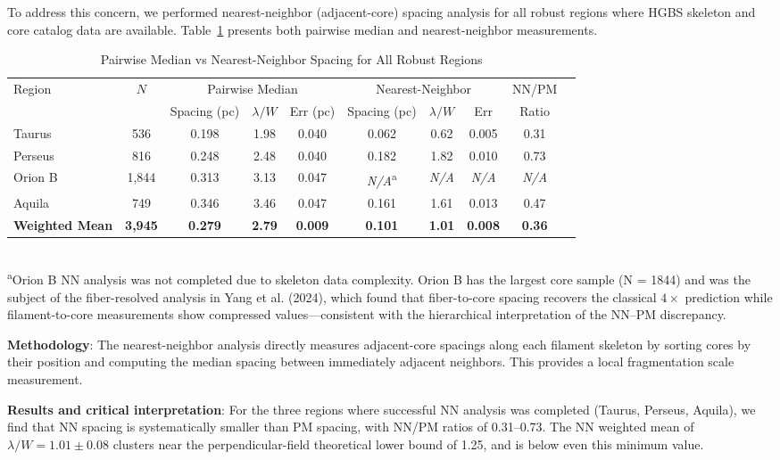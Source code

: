 \documentclass[twoside,twocolumn]{mnras}
\begin{document}
\begin{enumerate}
To address this concern, we performed nearest-neighbor (adjacent-core) spacing analysis for all robust regions where HGBS skeleton and core catalog data are available. Table~\ref{tab:nn_all} presents both pairwise median and nearest-neighbor measurements.

\begin{table}
\caption{Pairwise Median vs Nearest-Neighbor Spacing for All Robust Regions}
\label{tab:nn_all}
\begin{tabular}{lccccccccc}
\toprule
Region & $N$ & \multicolumn{3}{c}{Pairwise Median} & \multicolumn{3}{c}{Nearest-Neighbor} & NN/PM \\
\cmidrule{1-2}{\cmidrule{3-5}{\cmidrule{6-8}{\cmidrule{9-11}{\cmidrule{12-12}}
 & & Spacing (pc) & $\lambda/W$ & Err (pc) & Spacing (pc) & $\lambda/W$ & Err & Ratio \\
\midrule
Taurus   & 536   & 0.198 & 1.98 & 0.040 & 0.062 & 0.62 & 0.005 & 0.31 \\
Perseus  & 816   & 0.248 & 2.48 & 0.040 & 0.182 & 1.82 & 0.010 & 0.73 \\
Orion B  & 1,844 & 0.313 & 3.13 & 0.047 & \textit{N/A}\textsuperscript{a} & \textit{N/A} & \textit{N/A} & \textit{N/A} \\
Aquila   & 749   & 0.346 & 3.46 & 0.047 & 0.161 & 1.61 & 0.013 & 0.47 \\
\midrule
\textbf{Weighted Mean} & \textbf{3,945} & \textbf{0.279} & \textbf{2.79} & \textbf{0.009} & \textbf{0.101} & \textbf{1.01} & \textbf{0.008} & \textbf{0.36} \\
\bottomrule
\end{tabular}
\\
\footnotesize
\textsuperscript{a}Orion B NN analysis was not completed due to skeleton data complexity. Orion B has the largest core sample (N = 1844) and was the subject of the fiber-resolved analysis in Yang et al. (2024), which found that fiber-to-core spacing recovers the classical $4\times$ prediction while filament-to-core measurements show compressed values—consistent with the hierarchical interpretation of the NN--PM discrepancy.
\end{table}

\textbf{Methodology}: The nearest-neighbor analysis directly measures adjacent-core spacings along each filament skeleton by sorting cores by their position and computing the median spacing between immediately adjacent neighbors. This provides a local fragmentation scale measurement.

\textbf{Results and critical interpretation}: For the three regions where successful NN analysis was completed (Taurus, Perseus, Aquila), we find that NN spacing is systematically smaller than PM spacing, with NN/PM ratios of 0.31--0.73. The NN weighted mean of $\lambda/W = 1.01 \pm 0.08$ clusters near the perpendicular-field theoretical lower bound of 1.25, and is below even this minimum value.


\end{enumerate}
\end{document}
